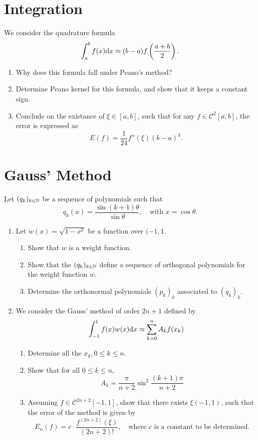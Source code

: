 \section{Integration}
We consider the quadrature formula
\[ \int_a^b f(x)\mathrm{d} x\approx(b-a)f\left(\frac{a+b}{2}\right). \]
\begin{enumerate}
	\item Why does this formula fall under Peano's method?
	\item Determine Peano kernel for this formula, and show that it keeps a constant sign.
	\item Conclude on the existance of \(\xi\in[a,b]\), such that for any \(f\in\mathcal{C}^2[a,b]\), the error is expressed as
	\[ E(f)=\frac{1}{24}f''(\xi)(b-a)^3. \]
\end{enumerate}


\section{Gauss' Method}
Let \((q_k)_{k\in\mathbb{N}}\) be a sequence of polynomials such that
\[ q_k(x)=\frac{\sin(k+1)\theta}{\sin\theta}, \quad\text{with } x=\cos\theta. \]
\begin{enumerate}
	\item Let \(w(x)=\sqrt{1-x^2}\) be a function over \((-1,1\).
	\begin{enumerate}
		\item Show that $w$ is a weight function.
		\item Show that the \((q_k)_{k\in\mathbb{N}}\) define a sequence of orthogonal polynomials for the weight function $w$.
		\item Determine the orthonormal polynomials \((p_k)_k\) associated to \((q_k)_k\).
	\end{enumerate}
	\item We consider the Gauss' method of order \(2n+1\) defined by
	\[ \int_{-1}^{1}f(x)w(x)\mathrm{d} x\approx \sum_{k=0}^{n}A_kf(x_k) \]
	\begin{enumerate}
		\item Determine all the \(x_k,0\leq k\leq n\).
		\item Show that for all \(0\leq k\leq n\),
		\[ A_k=\frac{\pi}{n+2}\sin^2\frac{(k+1)\pi}{n+2} \]
		\item Assuming \(f\in\mathcal{C}^{2n+2}[−1, 1]\), show that there exists \(\xi(−1,1)\), such that the error of the method is given by
		\[ E_n(f)=c\cdot\frac{f^{(2n+2)}(\xi)}{(2n+2)!},\quad \text{where }c\text{ is a constant to be determined.} \]
	\end{enumerate}
\end{enumerate}